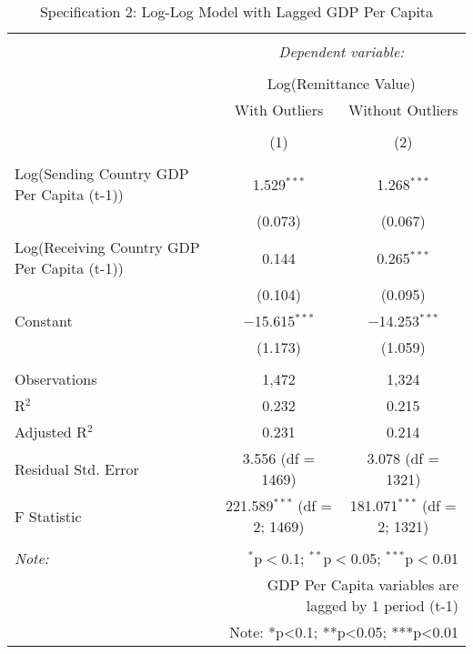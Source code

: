 
\begin{table}[!htbp] \centering 
  \caption{Specification 2: Log-Log Model with Lagged GDP Per Capita} 
  \label{} 
\begin{tabular}{@{\extracolsep{5pt}}lcc} 
\\[-1.8ex]\hline 
\hline \\[-1.8ex] 
 & \multicolumn{2}{c}{\textit{Dependent variable:}} \\ 
\cline{2-3} 
\\[-1.8ex] & \multicolumn{2}{c}{Log(Remittance Value)} \\ 
 & With Outliers & Without Outliers \\ 
\\[-1.8ex] & (1) & (2)\\ 
\hline \\[-1.8ex] 
 Log(Sending Country GDP Per Capita (t-1)) & 1.529$^{***}$ & 1.268$^{***}$ \\ 
  & (0.073) & (0.067) \\ 
  Log(Receiving Country GDP Per Capita (t-1)) & 0.144 & 0.265$^{***}$ \\ 
  & (0.104) & (0.095) \\ 
  Constant & $-$15.615$^{***}$ & $-$14.253$^{***}$ \\ 
  & (1.173) & (1.059) \\ 
 \hline \\[-1.8ex] 
Observations & 1,472 & 1,324 \\ 
R$^{2}$ & 0.232 & 0.215 \\ 
Adjusted R$^{2}$ & 0.231 & 0.214 \\ 
Residual Std. Error & 3.556 (df = 1469) & 3.078 (df = 1321) \\ 
F Statistic & 221.589$^{***}$ (df = 2; 1469) & 181.071$^{***}$ (df = 2; 1321) \\ 
\hline 
\hline \\[-1.8ex] 
\textit{Note:}  & \multicolumn{2}{r}{$^{*}$p$<$0.1; $^{**}$p$<$0.05; $^{***}$p$<$0.01} \\ 
 & \multicolumn{2}{r}{GDP Per Capita variables are lagged by 1 period (t-1)} \\ 
 & \multicolumn{2}{r}{Note: *p<0.1; **p<0.05; ***p<0.01} \\ 
\end{tabular} 
\end{table} 
